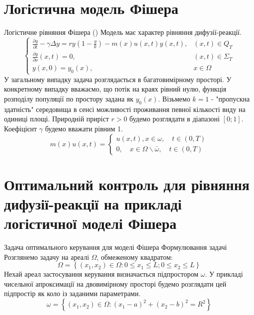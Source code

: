 \documentclass[a4paper,12pt]{extreport}
\begin{document}
\section{Логістична модель Фішера}
Логістичне рівняння Фішера (\cite{4})
Модель має характер рівняння дифузії-реакції. 
$$
\begin{cases}\frac{\partial y}{\partial t}-\gamma \Delta y=r y\left(1-\frac{y}{k}\right)-m(x) u(x, t) y(x, t), & (x, t) \in Q_T \\ \frac{\partial y}{\partial \nu}(x, t)=0, & (x, t) \in \Sigma_T \\ y(x, 0)=y_0(x), & x \in \Omega\end{cases}
$$
У загальному випадку задача розглядається в багатовимірному просторі. У конкретному випадку вважаємо, що потік на краях рівний нулю, функція розподілу популяції по простору задана як $y_0(x)$. 
Візьмемо $k=1$ - "пропускна здатність"  середовища в сенсі можливості проживання певної кількості виду на одиниці площі. Природній приріст $r > 0$ будемо розглядати в діапазоні $[0; 1]$. Коефіцієнт $\gamma$ будемо вважати рівним 1.
$$
m(x) u(x, t)=\left\{\begin{array}{l}
u(x, t), x \in \omega, \quad t \in(0, T) \\
0, \quad x \in \Omega \backslash \bar{\omega}, \quad t \in(0, T)
\end{array}\right.
$$
\section{Оптимальний контроль для рівняння дифузії-реакції на прикладі логістичної моделі Фішера}
Задача оптимального керування для моделі Фішера
Формулювання задачі
Розглянемо задачу на ареалі $\Omega$, обмеженому квадратом:
$$
\Omega=\left\{\left(x_1, x_2\right) \in \Omega: 0 \leq x_1 \leq L ; 0 \leq x_2 \leq L\right \}
$$
Нехай ареал застосування керування визначається підпростором $\omega$. У прикладі чисельної апроксимації на двовимірному просторі будемо розглядати цей підпростір як коло із заданими параметрами.
$$
\omega=\left\{\left(x_1, x_2\right) \in \Omega:\left(x_1-a\right)^2+\left(x_2-b\right)^2=R^2\right\}
$$
\end{document}
